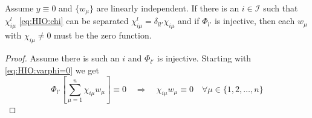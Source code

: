 


\begin{proposition}{}{} \label{prop:HIO:w=0}
	Assume $y\equiv 0$ and $\{w_\mu\}$ are linearly independent. If there is an $i\in
	\mathcal{I}$ such 
	that $\chi_{i\mu}^l$ \eqref{eq:HIO:chi} can be 
	separated $\chi^l_{i\mu}=\delta_{ll'}
	\chi_{i\mu}$ and if $\Phi_{l'}$ is injective, then each $w_\mu$ with $\chi_{i\mu}
	\neq 0$ 
	must be the zero function.
\end{proposition}
\begin{proof}
	Assume there is such an $i$ and $\Phi_{l'}$ is injective. Starting with 
	\eqref{eq:HIO:varphi=0} we get
	\begin{equation}
	\Phi_{l'} \left[ \sum\limits_{\mu=1}^n\chi_{i\mu} w_\mu \right] \equiv 0
	\quad \Rightarrow \quad 
	\chi_{i\mu} w_\mu \equiv 0 \quad \forall \mu\in\{1,2,\ldots,n\}
	\end{equation}
\end{proof}

